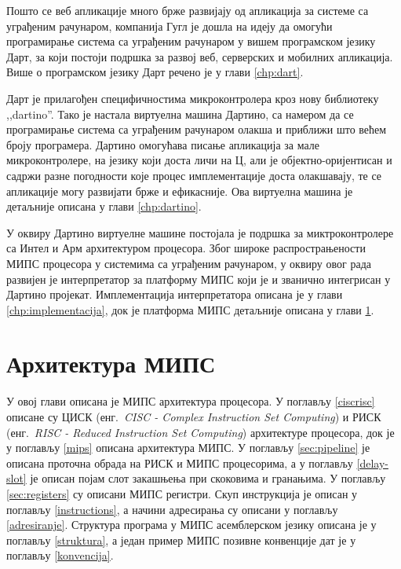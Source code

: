 \documentclass[12pt,oneside]{memoir}
\begin{document}
Пошто се веб апликације много брже развијају од апликација за системе са уграђеним рачунаром, компанија Гугл је дошла на идеју да омогући програмирање система са уграђеним рачунаром у вишем програмском језику Дарт, за који постоји подршка за развој веб, серверских и мобилних апликација. Више о програмском језику Дарт речено је у глави \ref{chp:dart}.

Дарт је прилагођен специфичностима микроконтролера кроз нову библиотеку ,,dartino''. Тако је настала виртуелна машина Дартино, са намером да се програмирање система са уграђеним рачунаром олакша и приближи што већем броју програмера. Дартино омогућава писање апликација за мале микроконтролере, на језику који доста личи на Ц, али је објектно-оријентисан и садржи разне погодности које процес имплементације доста олакшавају, те се апликације могу развијати брже и ефикасније. Ова виртуелна машина је детаљније описана у глави \ref{chp:dartino}.

У оквиру Дартино виртуелне машине постојала је подршка за миктроконтролере са Интел и Арм архитектуром процесора. Због широке распрострањености МИПС процесора у системима са уграђеним рачунаром, у оквиру овог рада развијен је интерпретатор за платформу МИПС који је и званично интегрисан у Дартино пројекат. Имплементација интерпретатора описана је у глави \ref{chp:implementacija}, док је платформа МИПС детаљније описана у глави \ref{chp:mips}.\\




\chapter{Архитектура МИПС}
\label{chp:mips}
У овој глави описана је МИПС архитектура процесора. У поглављу \ref{ciscrisc} описане су ЦИСК (енг.~\textit{CISC - Complex Instruction Set Computing}) и РИСК (енг.~\textit{RISC - Reduced Instruction Set Computing}) архитектуре процесора, док је у поглављу \ref{mips} описана архитектура МИПС. У поглављу \ref{sec:pipeline} је описана проточна обрада на РИСК и МИПС процесорима, а у поглављу \ref{delay-slot} је описан појам слот закашњења при скоковима и гранањима.  У поглављу \ref{sec:registers} су описани МИПС регистри. Скуп инструкција је описан у поглављу \ref{instructions}, а начини адресирања су описани у поглављу \ref{adresiranje}. Структура програма у МИПС асемблерском језику описана је у поглављу \ref{struktura}, а један пример МИПС позивне конвенције дат је у поглављу \ref{konvencija}.
\end{document}
